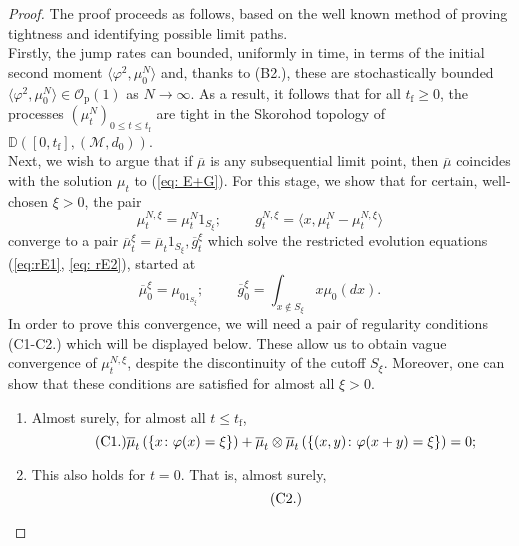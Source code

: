 \documentclass[11pt, notitlepage]{article}
\begin{document}
\begin{proof} The proof proceeds as follows, based on the well known method of proving tightness and identifying possible limit paths. \medskip \\  Firstly, the jump rates can bounded, uniformly in time, in terms of the initial second moment $\langle \varphi^2, \mu^N_0\rangle$ and, thanks to (B2.), these are stochastically bounded $\langle \varphi^2, \mu^N_0\rangle \in \mathcal{O}_\mathrm{p}(1)$ as $N\rightarrow \infty$. As a result, it follows that for all  $t_\mathrm{f}\ge 0$, the processes $(\mu^N_t)_{0\le t\le t_\mathrm{f}}$ are tight in the Skorohod topology of $\mathbb{D}([0,t_\mathrm{f}],(\mathcal{M},d_0))$.  \medskip \\ Next, we wish to argue that if $\overline{\mu}$ is any subsequential limit point, then $\overline{\mu}$ coincides with the solution $\mu_t$ to (\ref{eq: E+G}). For this stage, we show that for certain, well-chosen $\xi>0$, the pair \begin{equation} \mu^{N,\xi}_t=\mu^N_t1_{S_\xi}; \hspace{1cm} g^{N,\xi}_t=\langle x, \mu^N_t-\mu^{N,\xi}_t\rangle  \end{equation} converge to a pair $\overline{\mu}^\xi_t=\overline{\mu}_t1_{S_\xi}, \overline{g}^\xi_t$ which solve the restricted evolution equations (\ref{eq:rE1},  \ref{eq: rE2}), started at \begin{equation} \overline{\mu}^\xi_0=\mu_01_{S_\xi}; \hspace{1cm} \overline{g}^\xi_0=\int_{x\not \in S_\xi} x\mu_0(dx). \end{equation} In order to prove this convergence, we will need a pair of regularity conditions (C1-C2.) which will be displayed below. These allow us to obtain vague convergence of $\mu^{N,\xi}_t$, despite the discontinuity of the cutoff $S_\xi$.  Moreover, one can show that these conditions are satisfied for almost all $\xi>0$.  \begin{enumerate}[label=\roman{*}).]\item Almost surely, for  almost all $t\le t_\mathrm{f}$, \begin{equation} \label{eq: reg} \tag{{C1.}}
   \overline{\mu}_t\left(\left\{x\colon \varphi(x) = \xi\right\}\right) + 
    \overline{\mu}_t \otimes \overline{\mu}_t \left(\left\{(x,y) \colon \varphi(x+y) = \xi\right\}\right) = 0;
\end{equation} \item This also holds for $t=0$. That is, almost surely, \begin{equation} \label{eq: reg2} \tag{{C2.}}

\end{equation}
\end{enumerate}
\end{proof}
\end{document}
